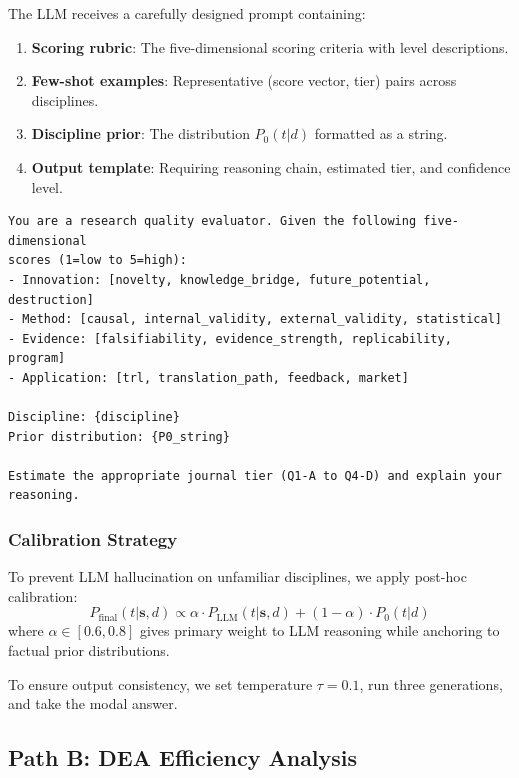 The LLM receives a carefully designed prompt containing:

\begin{enumerate}
    \item \textbf{Scoring rubric}: The five-dimensional scoring criteria with level descriptions.
    \item \textbf{Few-shot examples}: Representative (score vector, tier) pairs across disciplines.
    \item \textbf{Discipline prior}: The distribution $P_0(t|d)$ formatted as a string.
    \item \textbf{Output template}: Requiring reasoning chain, estimated tier, and confidence level.
\end{enumerate}

\begin{verbatim}
You are a research quality evaluator. Given the following five-dimensional
scores (1=low to 5=high):
- Innovation: [novelty, knowledge_bridge, future_potential, destruction]
- Method: [causal, internal_validity, external_validity, statistical]
- Evidence: [falsifiability, evidence_strength, replicability, program]
- Application: [trl, translation_path, feedback, market]

Discipline: {discipline}
Prior distribution: {P0_string}

Estimate the appropriate journal tier (Q1-A to Q4-D) and explain your reasoning.
\end{verbatim}

\subsubsection{Calibration Strategy}

To prevent LLM hallucination on unfamiliar disciplines, we apply post-hoc calibration:
\begin{equation}
P_{\text{final}}(t|\mathbf{s}, d) \propto \alpha \cdot P_{\text{LLM}}(t|\mathbf{s}, d) + (1-\alpha) \cdot P_0(t|d)
\end{equation}
where $\alpha \in [0.6, 0.8]$ gives primary weight to LLM reasoning while anchoring to factual prior distributions.

To ensure output consistency, we set temperature $\tau = 0.1$, run three generations, and take the modal answer.

\subsection{Path B: DEA Efficiency Analysis}

